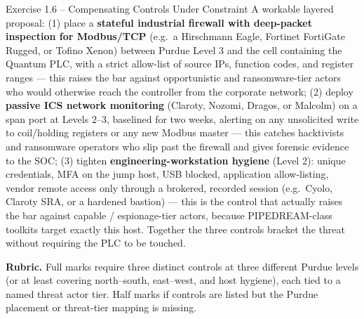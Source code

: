 \documentclass[11pt,a4paper]{article}
\begin{document}
\begin{solutionbox}{Exercise 1.6 -- Compensating Controls Under Constraint}
A workable layered proposal: (1) place a \textbf{stateful industrial firewall with deep-packet inspection for Modbus/TCP} (e.g.\ a Hirschmann Eagle, Fortinet FortiGate Rugged, or Tofino Xenon) between Purdue Level 3 and the cell containing the Quantum PLC, with a strict allow-list of source IPs, function codes, and register ranges --- this raises the bar against opportunistic and ransomware-tier actors who would otherwise reach the controller from the corporate network; (2) deploy \textbf{passive ICS network monitoring} (Claroty, Nozomi, Dragos, or Malcolm) on a span port at Levels 2--3, baselined for two weeks, alerting on any unsolicited write to coil/holding registers or any new Modbus master --- this catches hacktivists and ransomware operators who slip past the firewall and gives forensic evidence to the SOC; (3) tighten \textbf{engineering-workstation hygiene} (Level 2): unique credentials, MFA on the jump host, USB blocked, application allow-listing, vendor remote access only through a brokered, recorded session (e.g.\ Cyolo, Claroty SRA, or a hardened bastion) --- this is the control that actually raises the bar against capable / espionage-tier actors, because PIPEDREAM-class toolkits target exactly this host. Together the three controls bracket the threat without requiring the PLC to be touched.

\textbf{Rubric.} Full marks require three distinct controls at three different Purdue levels (or at least covering north--south, east--west, and host hygiene), each tied to a named threat actor tier. Half marks if controls are listed but the Purdue placement or threat-tier mapping is missing.
\end{solutionbox}
\end{document}

